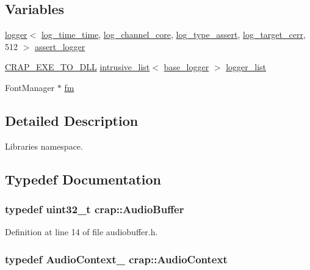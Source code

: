 \subsection*{Variables}
\begin{DoxyCompactItemize}
\item 
\hyperlink{classcrap_1_1logger}{logger}$<$ \hyperlink{structcrap_1_1log__time__time}{log\+\_\+time\+\_\+time}, \hyperlink{structcrap_1_1log__channel__core}{log\+\_\+channel\+\_\+core}, \hyperlink{structcrap_1_1log__type__assert}{log\+\_\+type\+\_\+assert}, \hyperlink{structcrap_1_1log__target__cerr}{log\+\_\+target\+\_\+cerr}, 512 $>$ \hyperlink{namespacecrap_a31dfc9e83068ad8e122d05579a3322a9}{assert\+\_\+logger}
\item 
\hyperlink{crap__compiler_8h_a22f1e589532ca1fcdf4d58c8efd81c9f}{C\+R\+A\+P\+\_\+\+E\+X\+E\+\_\+\+T\+O\+\_\+\+D\+L\+L} \hyperlink{classcrap_1_1intrusive__list}{intrusive\+\_\+list}$<$ \hyperlink{classcrap_1_1base__logger}{base\+\_\+logger} $>$ \hyperlink{namespacecrap_a17294cf82d452e8620bc69961147966c}{logger\+\_\+list}
\item 
Font\+Manager $\ast$ \hyperlink{namespacecrap_a71c658e1e72d3374202195926265b0d9}{fm}
\end{DoxyCompactItemize}


\subsection{Detailed Description}
Libraries namespace. 

\subsection{Typedef Documentation}
\hypertarget{namespacecrap_a90f6b78604f0bc004080819aa4691107}{}
\subsubsection[{Audio\+Buffer}]{\setlength{\rightskip}{0pt plus 5cm}typedef uint32\+\_\+t {\bf crap\+::\+Audio\+Buffer}}\label{namespacecrap_a90f6b78604f0bc004080819aa4691107}


Definition at line 14 of file audiobuffer.\+h.

\hypertarget{namespacecrap_a4d9ca11977af369032d36460bc1c80e7}{}
\subsubsection[{Audio\+Context}]{\setlength{\rightskip}{0pt plus 5cm}typedef {\bf Audio\+Context\+\_\+} {\bf crap\+::\+Audio\+Context}}\label{namespacecrap_a4d9ca11977af369032d36460bc1c80e7}


